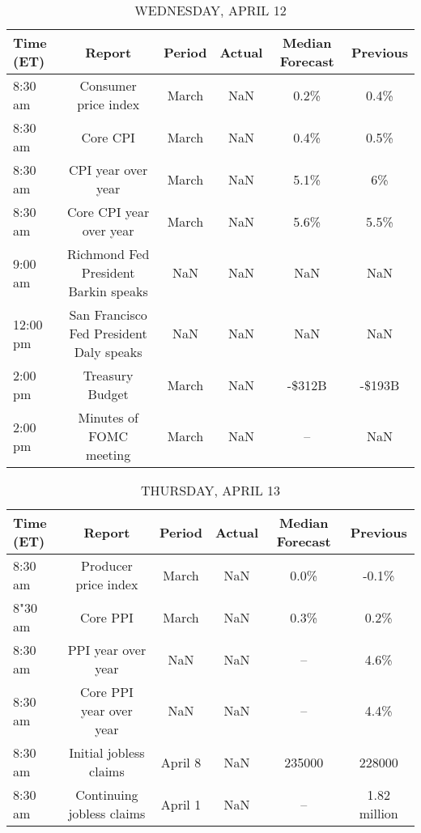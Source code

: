 \documentclass{article}%
\begin{document}
\begin{table}[htbp]%
\caption{WEDNESDAY, APRIL 12}%
\centering%
\begin{adjustbox}{width=1\textwidth}%
\begin{tabular}{lccccc}
\toprule
Time (ET) &                                  Report & Period & Actual & Median Forecast & Previous \\
\midrule
  8:30 am &                    Consumer price index &  March &    NaN &            0.2\% &     0.4\% \\
  8:30 am &                                Core CPI &  March &    NaN &            0.4\% &     0.5\% \\
  8:30 am &                      CPI year over year &  March &    NaN &            5.1\% &       6\% \\
  8:30 am &                 Core CPI year over year &  March &    NaN &            5.6\% &     5.5\% \\
  9:00 am &    Richmond Fed President Barkin speaks &    NaN &    NaN &             NaN &      NaN \\
 12:00 pm & San Francisco Fed President Daly speaks &    NaN &    NaN &             NaN &      NaN \\
  2:00 pm &                         Treasury Budget &  March &    NaN &          -\$312B &   -\$193B \\
  2:00 pm &                 Minutes of FOMC meeting &  March &    NaN &              -- &      NaN \\
\bottomrule
\end{tabular}
%
\end{adjustbox}%
\end{table}

%


\begin{table}[htbp]%
\caption{THURSDAY, APRIL 13}%
\centering%
\begin{adjustbox}{width=1\textwidth}%
\begin{tabular}{lccccc}
\toprule
Time (ET) &                    Report &  Period & Actual & Median Forecast &     Previous \\
\midrule
  8:30 am &      Producer price index &   March &    NaN &            0.0\% &        -0.1\% \\
  8"30 am &                  Core PPI &   March &    NaN &            0.3\% &         0.2\% \\
  8:30 am &        PPI year over year &     NaN &    NaN &              -- &         4.6\% \\
  8:30 am &   Core PPI year over year &     NaN &    NaN &              -- &         4.4\% \\
  8:30 am &    Initial jobless claims & April 8 &    NaN &          235000 &       228000 \\
  8:30 am & Continuing jobless claims & April 1 &    NaN &              -- & 1.82 million \\
\bottomrule
\end{tabular}
%
\end{adjustbox}%
\end{table}
\end{document}
